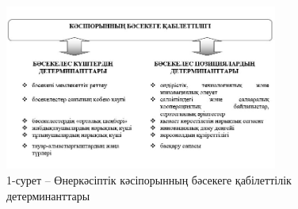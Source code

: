\begin{figure}[H]
	\centering
	\includegraphics[width=0.8\textwidth]{media/ekon/image1.1}
	\caption*{1-сурет -- Өнеркәсіптік кәсіпорынның бәсекеге қабілеттілік
	детерминанттары}
\end{figure}

